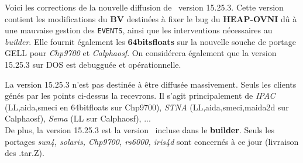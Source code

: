 
\Begin
{}

\bigskip

Voici les corrections de la nouvelle diffusion de
\LeLisp\ version 15.25.3.
Cette version contient les modifications du {\bf BV} destin\'{e}es \`{a}
fixer le bug du {\bf HEAP-OVNI} 
d\^{u} \`{a} une mauvaise gestion des {\tt EVENTS}, ainsi
que les interventions n\'{e}cessaires au {\it builder}.
Elle fournit \'{e}galement les {\bf 64bitsfloats} sur la
nouvelle souche de portage 
GELL pour {\it Chp9700} et {\it Calphaosf}. On consid\'{e}rera \'{e}galement
que la version 15.25.3 sur DOS est 
debuggu\'{e}e et op\'{e}rationnelle.

La version 15.25.3 n'est pas destin\'{e}e \`{a} \^{e}tre diffus\'{e}e massivement.
Seuls les clients g\'{e}n\'{e}s par les points ci-dessus la recevrons.
Il s'agit principalement de {\it IPAC} (LL,aida,smeci en 64bitfloats sur
Chp9700), {\it STNA} (LL,aida,smeci,maida2d sur Calphaosf), {\it Sema} (LL sur
Calphaosf), ... \\
De plus, la version 15.25.3 est la version \LeLisp\ incluse
dans le {\bf builder}. Seuls les portages
{\it sun4, solaris, Chp9700, rs6000, iris4d} sont concern\'{e}s \`{a} ce jour
(livraison des .tar.Z).


